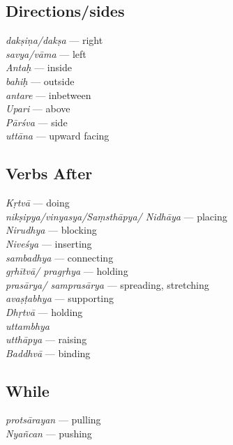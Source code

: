 \subsection*{Directions/sides}

\begin{multicols}{2}
\textit{dakṣiṇa/dakṣa} --- right\\
\textit{savya/vāma} --- left\\
\textit{Antaḥ} --- inside\\
\textit{bahiḥ} --- outside\\ 
\textit{antare} --- inbetween \\
\textit{Upari} --- above\\
\textit{Pārśva} --- side\\
\textit{uttāna} --- upward facing
\end{multicols}

\subsection*{Verbs After}

\begin{multicols}{2}
\textit{Kṛtvā} --- doing \\
\textit{nikṣipya/vinyasya/Saṃsthāpya/ Nidhāya}  --- placing \\
\textit{Nirudhya} --- blocking\\
\textit{Niveśya} --- inserting \\
\textit{sambadhya} --- connecting \\
\textit{gṛhītvā/ pragṛhya} --- holding\\
\textit{prasārya/ samprasārya} --- spreading, stretching \\
\textit{avaṣṭabhya} --- supporting \\
\textit{Dhṛtvā} --- holding \\
\textit{uttambhya} \\
\textit{utthāpya} --- raising \\
\textit{Baddhvā} --- binding 
\end{multicols}
\vspace{-10pt}

\subsection*{While}
\vspace{-10pt}

\begin{multicols}{2}
\textit{protsārayan} --- pulling \\
\textit{Nyañcan} --- pushing
\end{multicols}
 \vspace{-10pt}
 
